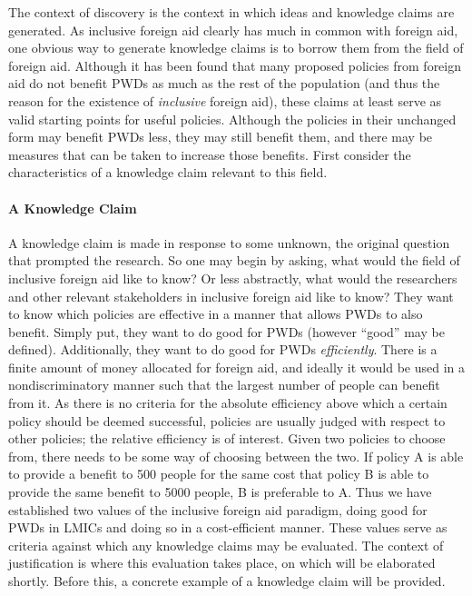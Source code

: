 \documentclass[a4paper]{article}
\begin{document}
The context of discovery is the context in which ideas and knowledge claims
are generated. As inclusive foreign aid clearly has much in common with
foreign aid, one obvious way to generate knowledge claims is to borrow them
from the field of foreign aid. Although it has been found that many proposed
policies from foreign aid do not benefit PWDs as much as the rest of the
population (and thus the reason for the existence of \emph{inclusive} foreign
aid), these claims at least serve as valid starting points for useful
policies. Although the policies in their unchanged form may benefit PWDs less,
they may still benefit them, and there may be measures that can be taken to
increase those benefits. First consider the characteristics of a knowledge
claim relevant to this field.


\paragraph{A Knowledge Claim}

A knowledge claim is made in response to some unknown, the original question
that prompted the research. So one may begin by asking, what would the field
of inclusive foreign aid like to know? Or less abstractly, what would the
researchers and other relevant stakeholders in inclusive foreign aid like to
know? They want to know which policies are effective in a manner that allows
PWDs to also benefit. Simply put, they want to do good for PWDs (however
``good'' may be defined). Additionally, they want to do good for PWDs
\emph{efficiently}. There is a finite amount of money allocated for foreign
aid, and ideally it would be used in a nondiscriminatory manner such that the
largest number of people can benefit from it. As there is no criteria for the
absolute efficiency above which a certain policy should be deemed successful,
policies are usually judged with respect to other policies; the relative
efficiency is of interest. Given two policies to choose from, there needs to
be some way of choosing between the two. If policy A is able to provide a
benefit to 500 people for the same cost that policy B is able to provide the
same benefit to 5000 people, B is preferable to A. Thus we have established
two values of the inclusive foreign aid paradigm, doing good for PWDs in LMICs
and doing so in a cost-efficient manner. These values serve as criteria
against which any knowledge claims may be evaluated. The context of
justification is where this evaluation takes place, on which will be
elaborated shortly. Before this, a concrete example of a knowledge claim will
be provided.
\end{document}
